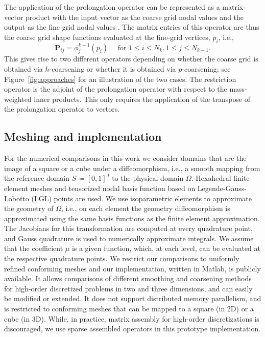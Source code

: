 \documentclass[times]{nlaauth}
\begin{document}
The application of the prolongation operator can be represented as a matrix-vector
product with the input vector as the coarse grid nodal values and the
output as the fine grid nodal values \cite{SampathBiros10}. The matrix
entries of this operator are thus the coarse grid shape functions evaluated at the fine-grid
vertices, $p_i$, i.e.,
\begin{equation}
	\label{eq:Pstencil}
	\mathbf P_{\!ij} = \phi_j^{k-1}(p_i) \quad \text{ for } 1\le i \le N_k, 1\le j\le N_{k-1}. 
\end{equation}
This gives rise to two different operators depending on whether the
coarse grid is obtained via $h$-coarsening or whether it is obtained
via $p$-coarsening; see Figure~\ref{fig:approaches} for an
illustration of the two cases. The restriction operator is the adjoint
of the prolongation operator with respect to the mass-weighted inner
products. This only requires the application of the transpose of the
prolongation operator to vectors. %


\subsection{Meshing and implementation} %
\label{sub:meshing}

For the numerical comparisons in this work we consider domains that
are the image of a square or a cube under a
diffeomorphism, i.e., a smooth mapping from the reference domain
$S\coloneqq[0,1]^d$ to the physical domain $\Omega$. Hexahedral finite
element meshes and tensorized nodal basis function based on
Legende-Gauss-Lobotto (LGL) points are used.  We use isoparametric
elements to approximate the geometry of $\Omega$, i.e., on each element the geometry
diffeomorphism is approximated using the same basis
functions as the
finite element approximation. The Jacobians for this transformation
are computed at every quadrature point, and Gauss quadrature is used
to numerically approximate integrals.
We assume that the coefficient $\mu$ is a given function, which, at each level, can be evaluated at the respective quadrature points.
We restrict our comparisons to uniformly refined conforming meshes and our implementation, written in Matlab, is publicly available. It allows comparisons of different smoothing and
coarsening methods for high-order discretized problems in two and three dimensions, and can
easily be modified or extended. It does not support distributed memory
parallelism, and is
restricted to conforming meshes that can be mapped to a square (in 2D) or a
cube (in 3D). While, in practice, matrix assembly for
high-order discretizations is discouraged, we use sparse
assembled operators in this prototype implementation.
\end{document}
